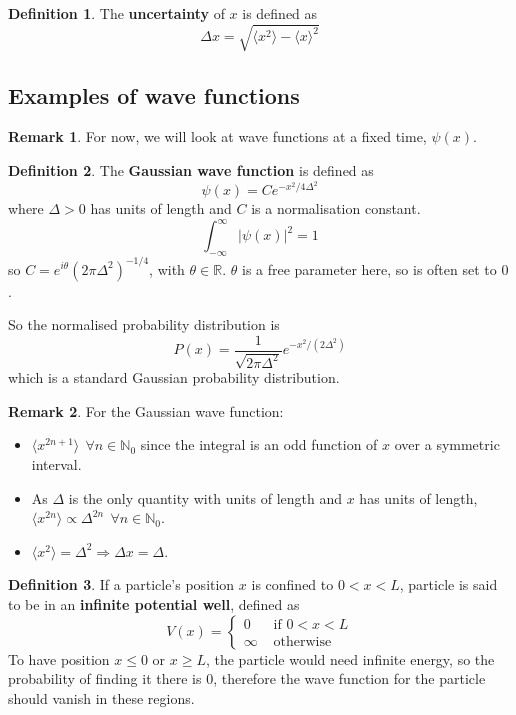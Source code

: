 \documentclass[12pt,a4paper]{article}
\theoremstyle{definition}
\newtheorem{definition}{Definition}[subsection]
\newtheorem*{remark}{Remark}
\let\oldforall\forall
\renewcommand{\forall}{\ \oldforall}
\begin{document}
\begin{definition}
	The \textbf{uncertainty} of $x$ is defined as
	\[
		\Delta x = \sqrt{\langle x^2 \rangle - \langle x \rangle ^2}
	\]
\end{definition}

\subsection{Examples of wave functions}

\begin{remark}
	For now, we will look at wave functions at a fixed time, $\psi(x)$.
\end{remark}

\begin{definition}
	The \textbf{Gaussian wave function} is defined as
	\[
		\psi(x) = C e^{-x^2 / 4 \Delta^2}
	\]
	where $\Delta > 0$ has units of length and $C$ is a normalisation constant.
	\[
		\int_{-\infty}^{\infty} |\psi(x)|^2 = 1
	\]
	so $C = e^{i \theta} {(2 \pi \Delta^2)}^{-1/4}$, with $\theta \in \mathbb{R}$. $\theta$ is a free parameter here, so is often set to $0$.

	So the normalised probability distribution is
	\[
		P(x) = \frac{1}{\sqrt{2 \pi \Delta^2}} e^{-x^2 / (2 \Delta^2)}
	\]
	which is a standard Gaussian probability distribution.
\end{definition}

\begin{remark}
	For the Gaussian wave function:
	\begin{itemize}
		\item $\langle x^{2n + 1} \rangle \ \forall n \in \mathbb{N}_0$ since the integral is an odd function of $x$ over a symmetric interval.
		\item As $\Delta$ is the only quantity with units of length and $x$ has units of length, $\langle x^{2n} \rangle \propto \Delta^{2n} \ \forall n \in \mathbb{N}_0$.
		\item $\langle x^2 \rangle = \Delta^2 \Longrightarrow \Delta x = \Delta$.
	\end{itemize}
\end{remark}

\begin{definition}
	If a particle's position $x$ is confined to $0 < x < L$, particle is said to be in an \textbf{infinite potential well}, defined as
	\[
		V(x) = \begin{cases}
			0 & \text{ if } 0 < x < L \\
			\infty & \text{ otherwise}
		\end{cases}
	\]
	To have position $x \le 0$ or $x \ge L$, the particle would need infinite energy, so the probability of finding it there is $0$, therefore the wave function for the particle should vanish in these regions.
\end{definition}
\end{document}

